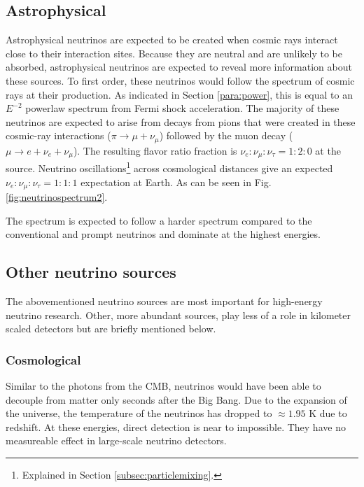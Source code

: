 \subsection{Astrophysical}
\label{subsec:astro}
Astrophysical neutrinos are expected to be created when cosmic rays interact close to their interaction sites. Because they are neutral and are unlikely to be absorbed, astrophysical neutrinos are expected to reveal more information about these sources. To first order, these neutrinos would follow the spectrum of cosmic rays at their production. As indicated in Section \ref{para:power}, this is equal to an $E^{-2}$ powerlaw spectrum from Fermi shock acceleration. The majority of these neutrinos are expected to arise from decays from pions that were created in these cosmic-ray interactions ($\pi \rightarrow \mu + \nu_\mu$) followed by the muon decay ($\mu \rightarrow e + \nu_e + \nu_\mu$). The resulting flavor ratio fraction is $\nu_e: \nu_\mu: \nu_\tau = 1:2:0$ at the source. Neutrino oscillations\footnote{Explained in Section \ref{subsec:particlemixing}.} across cosmological distances give an expected $\nu_e: \nu_\mu: \nu_\tau = 1:1:1$ expectation at Earth. As can be seen in Fig. \ref{fig:neutrinospectrum2}.

The spectrum is expected to follow a harder spectrum compared to the conventional and prompt neutrinos and dominate at the highest energies.

\subsection{Other neutrino sources}
The abovementioned neutrino sources are most important for high-energy neutrino research. Other, more abundant sources, play less of a role in kilometer scaled detectors but are briefly mentioned below. 

\subsubsection{Cosmological}
Similar to the photons from the CMB, neutrinos would have been able to decouple from matter only seconds after the Big Bang. Due to the expansion of the universe, the temperature of the neutrinos has dropped to $\approx 1.95$ K due to redshift. At these energies, direct detection is near to impossible. They have no measureable effect in large-scale neutrino detectors.
 
